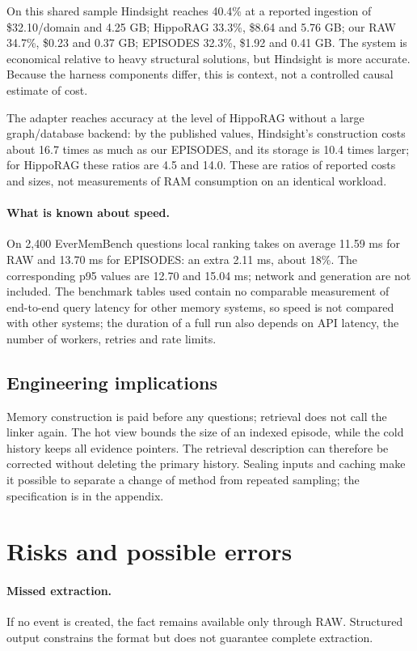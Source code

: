 \documentclass[11pt,a4paper]{article}
\newcommand{\raw}{RAW}
\newcommand{\episodes}{EPISODES}
\begin{document}
On this shared sample Hindsight reaches 40.4\% at a reported ingestion of
\$32.10/domain and 4.25 GB; HippoRAG 33.3\%, \$8.64 and 5.76 GB; our \raw{} 34.7\%,
\$0.23 and 0.37 GB; \episodes{} 32.3\%, \$1.92 and 0.41 GB. The system is economical
relative to heavy structural solutions, but Hindsight is more accurate. Because the
harness components differ, this is context, not a controlled causal estimate of cost.

The adapter reaches accuracy at the level of HippoRAG without a large graph/database
backend: by the published values, Hindsight's construction costs about 16.7 times as
much as our \episodes{}, and its storage is 10.4 times larger; for HippoRAG these ratios
are 4.5 and 14.0. These are ratios of reported costs and sizes, not measurements of
RAM consumption on an identical workload.

\paragraph{What is known about speed.}
On 2,400 EverMemBench questions local ranking takes on average 11.59 ms for RAW and
13.70 ms for EPISODES: an extra 2.11 ms, about 18\%. The corresponding p95 values are
12.70 and 15.04 ms; network and generation are not included. The benchmark tables
used contain no comparable measurement of end-to-end query latency for other memory
systems, so speed is not compared with other systems; the duration of a full run also
depends on API latency, the number of workers, retries and rate limits.

\subsection{Engineering implications}
Memory construction is paid before any questions; retrieval does not call the linker
again. The hot view bounds the size of an indexed episode, while the cold history keeps
all evidence pointers. The retrieval description can therefore be corrected without
deleting the primary history. Sealing inputs and caching make it possible to separate
a change of method from repeated sampling; the specification is in the appendix.

\section{Risks and possible errors}
\label{sec:errors}

\paragraph{Missed extraction.}
If no event is created, the fact remains available only through \raw{}. Structured
output constrains the format but does not guarantee complete extraction.
\end{document}
